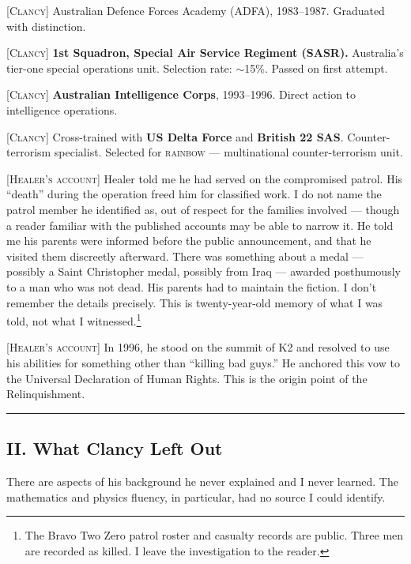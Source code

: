 \textsc{[Clancy]} Australian Defence Forces Academy (ADFA), 1983--1987. Graduated with distinction.

\textsc{[Clancy]} \textbf{1st Squadron, Special Air Service Regiment (SASR).} Australia's tier-one special operations unit. Selection rate: $\sim$15\%. Passed on first attempt.

\textsc{[Clancy]} \textbf{Australian Intelligence Corps}, 1993--1996. Direct action to intelligence operations.

\textsc{[Clancy]} Cross-trained with \textbf{US Delta Force} and \textbf{British 22 SAS}. Counter-terrorism specialist. Selected for \textsc{rainbow} --- multinational counter-terrorism unit.

\textsc{[Healer's account]} Healer told me he had served on the compromised  patrol. His ``death'' during the operation freed him for classified work. I do not name the patrol member he identified as, out of respect for the families involved --- though a reader familiar with the published accounts may be able to narrow it. He told me his parents were informed before the public announcement, and that he visited them discreetly afterward. There was something about a medal --- possibly a Saint Christopher medal, possibly from Iraq --- awarded posthumously to a man who was not dead. His parents had to maintain the fiction. I don't remember the details precisely. This is twenty-year-old memory of what I was told, not what I witnessed.\footnote{The Bravo Two Zero patrol roster and casualty records are public. Three men are recorded as killed. I leave the investigation to the reader.}

\textsc{[Healer's account]} In 1996, he stood on the summit of K2 and resolved to use his abilities for something other than ``killing bad guys.'' He anchored this vow to the Universal Declaration of Human Rights. This is the origin point of the Relinquishment.

\vspace{1cm}\hrule\vspace{1cm}

\subsection*{II. What Clancy Left Out}
\label{record:hd-what-clancy-left-out}

There are aspects of his background he never explained and I never learned. The mathematics and physics fluency, in particular, had no source I could identify.

